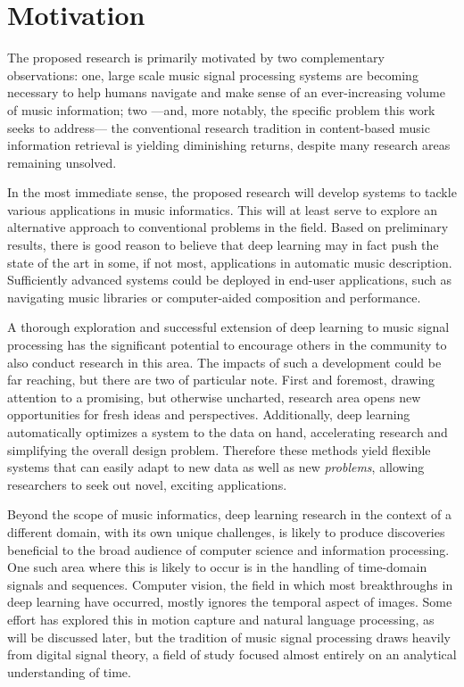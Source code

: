 \section{Motivation}


The proposed research is primarily motivated by two complementary observations:
one, large scale music signal processing systems are becoming necessary to help humans navigate and make sense of an ever-increasing volume of music information;
two ---and, more notably, the specific problem this work seeks to address--- the conventional research tradition in content-based music information retrieval is yielding diminishing returns, despite many research areas remaining unsolved.

In the most immediate sense, the proposed research will develop systems to tackle various applications in music informatics.
This will at least serve to explore an alternative approach to conventional problems in the field.
Based on preliminary results, there is good reason to believe that deep learning may in fact push the state of the art in some, if not most, applications in automatic music description.
Sufficiently advanced systems could be deployed in end-user applications, such as navigating music libraries or computer-aided composition and performance.

A thorough exploration and successful extension of deep learning to music signal processing has the significant potential to encourage others in the community to also conduct research in this area.
The impacts of such a development could be far reaching, but there are two of particular note.
First and foremost, drawing attention to a promising, but otherwise uncharted, research area opens new opportunities for fresh ideas and perspectives.
Additionally, deep learning automatically optimizes a system to the data on hand, accelerating research and simplifying the overall design problem.
Therefore these methods yield flexible systems that can easily adapt to new data as well as new \emph{problems}, allowing researchers to seek out novel, exciting applications.

Beyond the scope of music informatics, deep learning research in the context of a different domain, with its own unique challenges, is likely to produce discoveries beneficial to the broad audience of computer science and information processing.
One such area where this is likely to occur is in the handling of time-domain signals and sequences.
Computer vision, the field in which most breakthroughs in deep learning have occurred, mostly ignores the temporal aspect of images.
Some effort has explored this in motion capture and natural language processing, as will be discussed later, but the tradition of music signal processing draws heavily from digital signal theory, a field of study focused almost entirely on an analytical understanding of time.

